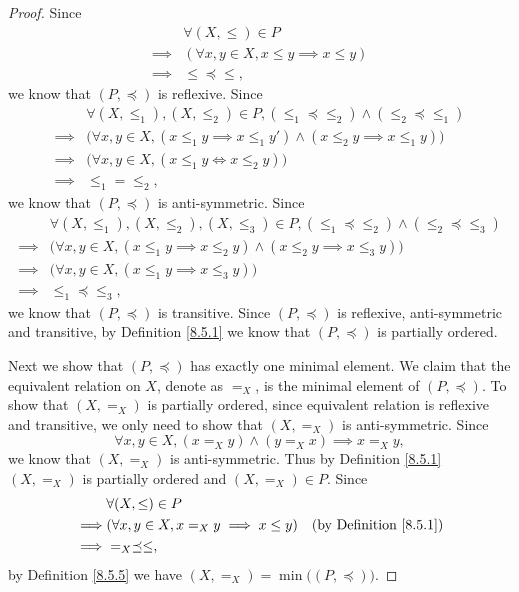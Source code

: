 \begin{proof}
    Since
    \begin{align*}
                 & \forall (X, \leq) \in P                          \\
        \implies & (\forall x, y \in X, x \leq y \implies x \leq y) \\
        \implies & \leq \preceq \leq,
    \end{align*}
    we know that \((P, \preceq)\) is reflexive.
    Since
    \begin{align*}
                 & \forall (X, \leq_1), (X, \leq_2) \in P, (\leq_1 \preceq \leq_2) \land (\leq_2 \preceq \leq_1)          \\
        \implies & \big(\forall x, y \in X, (x \leq_1 y \implies x \leq_1 y') \land (x \leq_2 y \implies x \leq_1 y)\big) \\
        \implies & \big(\forall x, y \in X, (x \leq_1 y \iff x \leq_2 y)\big)                                             \\
        \implies & \leq_1 = \leq_2,
    \end{align*}
    we know that \((P, \preceq)\) is anti-symmetric.
    Since
    \begin{align*}
                 & \forall (X, \leq_1), (X, \leq_2), (X, \leq_3) \in P, (\leq_1 \preceq \leq_2) \land (\leq_2 \preceq \leq_3) \\
        \implies & \big(\forall x, y \in X, (x \leq_1 y \implies x \leq_2 y) \land (x \leq_2 y \implies x \leq_3 y)\big)      \\
        \implies & \big(\forall x, y \in X, (x \leq_1 y \implies x \leq_3 y)\big)                                             \\
        \implies & \leq_1 \preceq \leq_3,
    \end{align*}
    we know that \((P, \preceq)\) is transitive.
    Since \((P, \preceq)\) is reflexive, anti-symmetric and transitive, by Definition \ref{8.5.1} we know that \((P, \preceq)\) is partially ordered.

    Next we show that \((P, \preceq)\) has exactly one minimal element.
    We claim that the equivalent relation on \(X\), denote as \(=_X\), is the minimal element of \((P, \preceq)\).
    To show that \((X, =_X)\) is partially ordered, since equivalent relation is reflexive and transitive, we only need to show that \((X, =_X)\) is anti-symmetric.
    Since
    \[
        \forall x, y \in X, (x =_X y) \land (y =_X x) \implies x =_X y,
    \]
    we know that \((X, =_X)\) is anti-symmetric.
    Thus by Definition \ref{8.5.1} \((X, =_X)\) is partially ordered and \((X, =_X) \in P\).
    Since
    \begin{align*}
                 & \forall (X, \leq) \in P                                                              \\
        \implies & (\forall x, y \in X, x =_X y \implies x \leq y) & \text{(by Definition \ref{8.5.1})} \\
        \implies & =_X \preceq \leq,
    \end{align*}
    by Definition \ref{8.5.5} we have \((X, =_X) = \min\big((P, \preceq)\big)\).


\end{proof}
